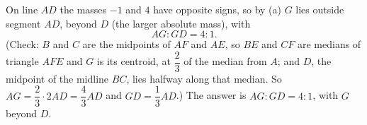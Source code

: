 On line $AD$ the masses $-1$ and $4$ have opposite signs, so by (a) $G$ lies outside segment $AD$, beyond $D$ (the larger absolute mass), with
\[AG:GD=4:1.\]
(Check: $B$ and $C$ are the midpoints of $AF$ and $AE$, so $BE$ and $CF$ are medians of triangle $AFE$ and $G$ is its centroid, at $\dfrac23$ of the median from $A$; and $D$, the midpoint of the midline $BC$, lies halfway along that median. So $AG=\dfrac23\cdot2AD=\dfrac43AD$ and $GD=\dfrac13AD$.) The answer is $\boxed{AG:GD=4:1}$, with $G$ beyond $D$.
